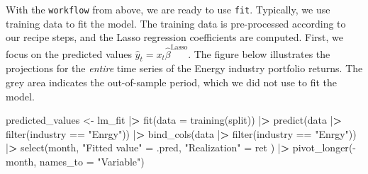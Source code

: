 \documentclass[
]{krantz}
\newenvironment{Shaded}{\begin{snugshade}}{\end{snugshade}}
\newcommand{\AttributeTok}[1]{\textcolor[rgb]{0.61,0.61,0.61}{#1}}
\newcommand{\ErrorTok}[1]{\textcolor[rgb]{0.14,0.14,0.14}{\textbf{#1}}}
\newcommand{\FunctionTok}[1]{\textcolor[rgb]{0,0,0}{#1}}
\newcommand{\NormalTok}[1]{#1}
\newcommand{\OtherTok}[1]{\textcolor[rgb]{0.37,0.37,0.37}{#1}}
\newcommand{\SpecialCharTok}[1]{\textcolor[rgb]{0,0,0}{#1}}
\newcommand{\StringTok}[1]{\textcolor[rgb]{0.5,0.5,0.5}{#1}}
\begin{document}
With the \texttt{workflow} from above, we are ready to use \texttt{fit}. Typically, we use training data to fit the model.
The training data is pre-processed according to our recipe steps, and the Lasso regression coefficients are computed.
First, we focus on the predicted values \(\hat{y}_t = x_t\hat\beta^\text{Lasso}.\) The figure below illustrates the projections for the \emph{entire} time series of the Energy industry portfolio returns. The grey area indicates the out-of-sample period, which we did not use to fit the model.

\begin{Shaded}
\begin{Highlighting}[]
\NormalTok{predicted\_values }\OtherTok{\textless{}{-}}\NormalTok{ lm\_fit }\SpecialCharTok{|}\ErrorTok{\textgreater{}}
  \FunctionTok{fit}\NormalTok{(}\AttributeTok{data =} \FunctionTok{training}\NormalTok{(split)) }\SpecialCharTok{|}\ErrorTok{\textgreater{}}
  \FunctionTok{predict}\NormalTok{(data }\SpecialCharTok{|}\ErrorTok{\textgreater{}} \FunctionTok{filter}\NormalTok{(industry }\SpecialCharTok{==} \StringTok{"Enrgy"}\NormalTok{)) }\SpecialCharTok{|}\ErrorTok{\textgreater{}}
  \FunctionTok{bind\_cols}\NormalTok{(data }\SpecialCharTok{|}\ErrorTok{\textgreater{}} \FunctionTok{filter}\NormalTok{(industry }\SpecialCharTok{==} \StringTok{"Enrgy"}\NormalTok{)) }\SpecialCharTok{|}\ErrorTok{\textgreater{}}
  \FunctionTok{select}\NormalTok{(month,}
    \StringTok{"Fitted value"} \OtherTok{=}\NormalTok{ .pred,}
    \StringTok{"Realization"} \OtherTok{=}\NormalTok{ ret}
\NormalTok{  ) }\SpecialCharTok{|}\ErrorTok{\textgreater{}}
  \FunctionTok{pivot\_longer}\NormalTok{(}\SpecialCharTok{{-}}\NormalTok{month, }\AttributeTok{names\_to =} \StringTok{"Variable"}\NormalTok{)}


\end{Highlighting}
\end{Shaded}
\end{document}
